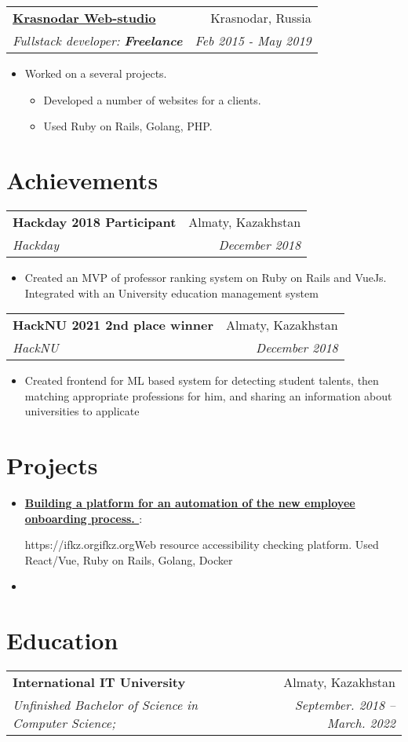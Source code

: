 \documentclass[letterpaper,11pt]{article}
\makeatletter
\newcommand{\resumeItem}[2]{
  \item\small{
    \textbf{#1}{ #2 \vspace{-2pt}}
  }
}
\newcommand{\inDescItem}[1]{
 \item\small{
   {#1\vspace{-3pt}}
 }
}
\newcommand{\inDescListStart}{\begin{itemize}[leftmargin=*]\vspace{-3pt}}
\newcommand{\inDescListEnd}{\end{itemize}\vspace{-8pt}}
\newcommand{\resumeAltSubheading}[4]{
  \vspace{5.5pt}
    \begin{tabular*}{1\textwidth}{l@{\extracolsep{\fill}}r}
      \textbf{#1} & #2 \\
      \textit{\small#3} & \textit{\small #4} \\
    \end{tabular*}\vspace{-4pt}

}
\newcommand{\projectItem}[3]{
    \inDescItem{\textbf{\href{#1}{#2\linkicon}}: #3}
}
\newcommand{\resumeSubItem}[2]{\resumeItem{#1}{#2}\vspace{-4pt}}
\newcommand{\resumeSubHeadingListStart}{\begin{itemize}[label={}, leftmargin=*]}
\newcommand{\resumeSubHeadingListEnd}{\end{itemize}}
\newcommand{\linkicon}{ \small\faicon{link}}
\makeatother
\begin{document}
  \resumeAltSubheading
    {\href{https://xn----7sbbb7bbx7alc6h.xn--p1ai/}{ Krasnodar Web-studio\linkicon}}
    {Krasnodar, Russia}
    {Fullstack developer: \textbf{Freelance}}
    {Feb 2015 - May 2019}
    \inDescListStart
        \inDescItem{Worked on a several projects.}
            \inDescListStart
                \inDescItem{Developed a number of websites for a clients.}
                \inDescItem{Used Ruby on Rails, Golang, PHP.}
            \inDescListEnd
   \inDescListEnd


\section{Achievements}\vspace{-4pt}
    \resumeAltSubheading
    {Hackday 2018 Participant}
    {Almaty, Kazakhstan}
    {Hackday}
    {December 2018}
     \inDescListStart
        \inDescItem{Created an MVP of professor ranking system on Ruby on Rails and VueJs. Integrated with an University education management system}
      \inDescListEnd
      
    \resumeAltSubheading
    {HackNU 2021 2nd place winner}
    {Almaty, Kazakhstan}
    {HackNU}
    {December 2018}
     \inDescListStart
        \inDescItem{Created frontend for ML based system for detecting student talents, then matching appropriate professions for him, and sharing an information about universities to applicate}
      \inDescListEnd


\section{Projects}
 \inDescListStart
  \projectItem{OnBoarding.kz [in-progress]}{Building a platform for an automation of the new employee onboarding process.}
  \projectItem{https://ifkz.org}{ifkz.org}{Web resource accessibility checking platform. Used React/Vue, Ruby on Rails, Golang, Docker}
 
 \inDescListEnd
  \resumeSubHeadingListStart
  \resumeSubItem{\href{}{\color{blue}}}
      {}
  \resumeSubHeadingListEnd


\section{Education}\vspace{-4pt}
  \resumeAltSubheading
  {International IT University}
  {Almaty, Kazakhstan}
  {Unfinished Bachelor of Science in Computer Science;}
  {September. 2018 -- March. 2022}
\end{document}
